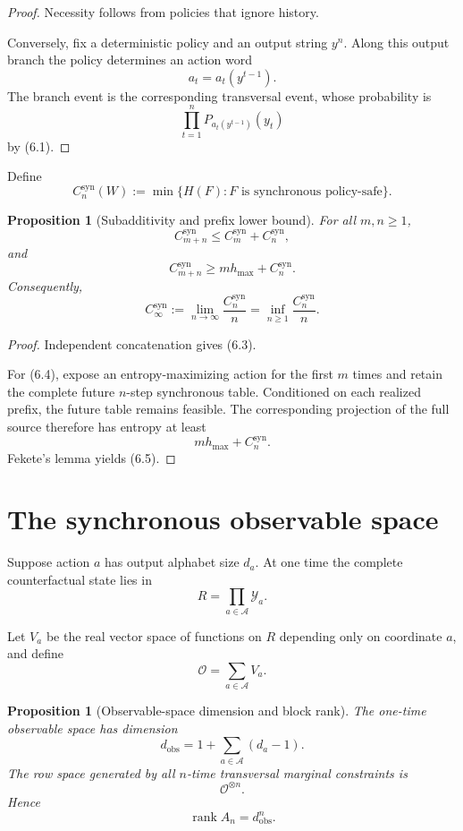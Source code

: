 \documentclass[11pt,a4paper]{article}
\newtheorem{proposition}[theorem]{Proposition}
\newcommand{\Csyn}{C^{\mathrm{syn}}}
\newcommand{\CinfSyn}{C_{\infty}^{\mathrm{syn}}}
\newcommand{\cA}{\mathcal A}
\newcommand{\cY}{\mathcal Y}
\newcommand{\cO}{\mathcal O}
\newcommand{\1}{\mathbf 1}
\begin{document}
\begin{proof}
Necessity follows from policies that ignore history.

Conversely, fix a deterministic policy and an output string \(y^n\).
Along this output branch the policy determines an action word
\[
a_t=a_t(y^{t-1}).
\]
The branch event is the corresponding transversal event, whose
probability is
\[
\prod_{t=1}^nP_{a_t(y^{t-1})}(y_t)
\]
by (6.1).
\end{proof}

Define
\[
\Csyn_n(W)
:=
\min
\{
H(F):
F\text{ is synchronous policy-safe}
\}.
\tag{6.2}
\]

\begin{proposition}[Subadditivity and prefix lower bound]
For all \(m,n\ge1\),
\[
\Csyn_{m+n}
\le
\Csyn_m+\Csyn_n,
\tag{6.3}
\]
and
\[
\Csyn_{m+n}
\ge
mh_{\max}+\Csyn_n.
\tag{6.4}
\]
Consequently,
\[
\CinfSyn
:=
\lim_{n\to\infty}\frac{\Csyn_n}{n}
=
\inf_{n\ge1}\frac{\Csyn_n}{n}.
\tag{6.5}
\]
\end{proposition}

\begin{proof}
Independent concatenation gives (6.3).

For (6.4), expose an entropy-maximizing action for the first
\(m\) times and retain the complete future \(n\)-step synchronous table.
Conditioned on each realized prefix, the future table remains feasible.
The corresponding projection of the full source therefore has entropy
at least
\[
mh_{\max}+\Csyn_n.
\]
Fekete's lemma yields (6.5).
\end{proof}


\section{The synchronous observable space}

Suppose action \(a\) has output alphabet size \(d_a\).
At one time the complete counterfactual state lies in
\[
R=\prod_{a\in\cA}\cY_a.
\]

Let \(V_a\) be the real vector space of functions on \(R\) depending
only on coordinate \(a\), and define
\[
\cO
=
\sum_{a\in\cA}V_a.
\tag{7.1}
\]

\begin{proposition}[Observable-space dimension and block rank]
The one-time observable space has dimension
\[
\boxed{
d_{\mathrm{obs}}
=
1+\sum_{a\in\cA}(d_a-1).
}
\tag{7.2}
\]
The row space generated by all \(n\)-time transversal marginal
constraints is
\[
\cO^{\otimes n}.
\tag{7.3}
\]
Hence
\[
\boxed{
\operatorname{rank}A_n
=
d_{\mathrm{obs}}^n.
}
\tag{7.4}
\]
\end{proposition}
\end{document}
